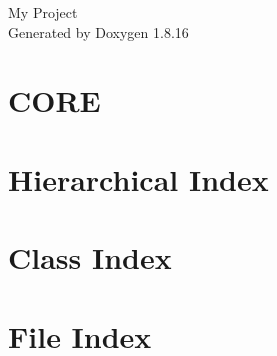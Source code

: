 \let\mypdfximage\pdfximage\def\pdfximage{\immediate\mypdfximage}\documentclass[twoside]{book}
\newcommand{\+}{\discretionary{\mbox{\scriptsize$\hookleftarrow$}}{}{}}
\newcommand{\clearemptydoublepage}{%
  \newpage{\pagestyle{empty}\cleardoublepage}%
}
\begin{document}
\hypersetup{pageanchor=false,
             bookmarksnumbered=true,
             pdfencoding=unicode
            }
\begin{titlepage}
\vspace*{7cm}
\begin{center}%
{\Large My Project }\\
\vspace*{1cm}
{\large Generated by Doxygen 1.8.16}\\
\end{center}
\end{titlepage}
\clearemptydoublepage
{}
\tableofcontents
\clearemptydoublepage
{}
\hypersetup{pageanchor=true}

\chapter{C\+O\+RE}
\label{md__assets__scripts__r_e_a_d_m_e}

\chapter{Hierarchical Index}

\chapter{Class Index}

\chapter{File Index}

\end{document}
